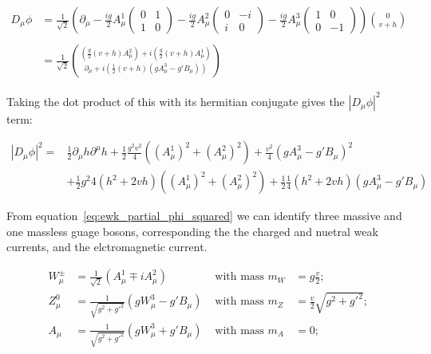 \begin{equation}\label{eq:ewk_covariant_derivative_acting_on_phi}
\begin{aligned}
D_{\mu}\phi & = \frac{1}{\sqrt{2}}\left( \partial_{\mu}
  - \frac{ig}{2}A_{\mu}^{1} 
  \begin{pmatrix}
    0  &  1 \\
    1  &  0
  \end{pmatrix}
  - \frac{ig}{2}A_{\mu}^{2} 
  \begin{pmatrix}
    0  & -i \\
    i  &  0
  \end{pmatrix}
  - \frac{ig}{2}A_{\mu}^{3} 
  \begin{pmatrix}
    1  &   0 \\
    0  & -1
  \end{pmatrix}
\right)\binom{0}{v+h} \\ \\
& = \frac{1}{\sqrt{2}}\binom{(\frac{g}{2}(v+h)A_{\mu}^{2}) +
  i(\frac{g}{2}(v+h)A_{\mu}^{1})}{\partial_{\mu} +
  i(\frac{1}{2}(v+h)(gA_{\mu}^{3}-g'B_{\mu}))}
\end{aligned}
\end{equation}

\noindent Taking the dot product of this with its hermitian conjugate
gives the $|D_{\mu}\phi|^{2}$ term:

\begin{equation}\label{eq:ewk_partial_phi_squared}
\begin{aligned}
|D_{\mu}\phi|^{2} = & \frac{1}{2}\partial_{\mu}h\partial^{\mu}h +
\frac{1}{2}\frac{g^{2}v^{2}}{4}( (A_{\mu}^{1})^{2} + (A_{\mu}^{2})^{2}
) +\frac{v^{2}}{4}(gA_{\mu}^{3}-g'B_{\mu})^{2}  \\
 & + \frac{1}{2}{g^{2}}{4}(h^{2}+2vh)( (A_{\mu}^{1})^{2} +
 (A_{\mu}^{2})^{2} ) +
 \frac{1}{2}\frac{1}{4}(h^{2}+2vh)(gA_{\mu}^{3}-g'B_{\mu}) 
\end{aligned}
\end{equation}

\noindent From equation~\ref{eq:ewk_partial_phi_squared} we
can identify three massive and one massless guage bosons,
corresponding the the charged and nuetral weak currents, and the
elctromagnetic current.  

\begin{equation}\label{eq:ewk_boson_masses}
\begin{aligned}
W_{\mu}^{\pm} & = \frac{1}{\sqrt{2}}(A_{\mu}^{1} \mp iA_{\mu}^{2}) 
&\text{  with mass  }  m_{W} &= g\frac{v}{2}\text{;} \\
Z_{\mu}^{0} & = \frac{1}{\sqrt{g^{2}+g'^{2}}}(gW_{\mu}^{3}-g'B_{\mu})  
&\text{  with mass  }  m_{Z} &= \frac{v}{2}\sqrt{g^{2}+g'^{2}}\text{;}  \\
A_{\mu} & = \frac{1}{\sqrt{g^{2}+g'^{2}}}(gW_{\mu}^{3}+g'B_{\mu}) 
&\text{  with mass  }  m_{A} &= 0 \text{;} 
\end{aligned}
\end{equation}

